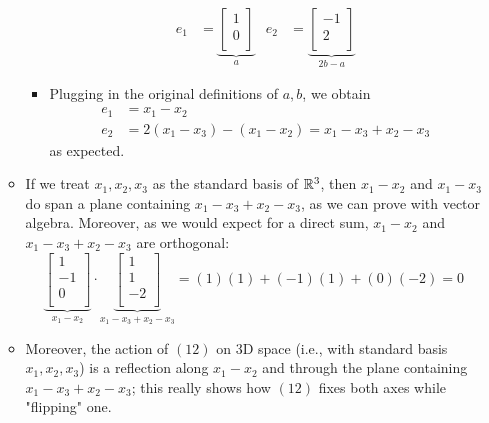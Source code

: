 \documentclass[../notes.tex]{subfiles}
\begin{document}
\begin{itemize}
\begin{itemize}
\begin{itemize}
\begin{align*}
                e_1 &= \underbrace{
                    \begin{bmatrix}
                        1\\
                        0\\
                    \end{bmatrix}
                }_a&
                e_2 &= \underbrace{
                    \begin{bmatrix}
                        -1\\
                        2\\
                    \end{bmatrix}
                }_{2b-a}
            \end{align*}
            \item Plugging in the original definitions of $a,b$, we obtain
            \begin{align*}
                e_1 &= x_1-x_2\\
                e_2 &= 2(x_1-x_3)-(x_1-x_2) = x_1-x_3+x_2-x_3
            \end{align*}
            as expected.
        \end{itemize}
        \item If we treat $x_1,x_2,x_3$ as the standard basis of $\mathbb{R}^3$, then $x_1-x_2$ and $x_1-x_3$ do span a plane containing $x_1-x_3+x_2-x_3$, as we can prove with vector algebra. Moreover, as we would expect for a direct sum, $x_1-x_2$ and $x_1-x_3+x_2-x_3$ are orthogonal:
        \begin{equation*}
            \underbrace{
                \begin{bmatrix}
                    1\\
                    -1\\
                    0\\
                \end{bmatrix}
            }_{x_1-x_2}\cdot\underbrace{
                \begin{bmatrix}
                    1\\
                    1\\
                    -2\\
                \end{bmatrix}
            }_{x_1-x_3+x_2-x_3}
            = (1)(1)+(-1)(1)+(0)(-2)
            = 0
        \end{equation*}
        \item Moreover, the action of $(12)$ on 3D space (i.e., with standard basis $x_1,x_2,x_3$) is a reflection along $x_1-x_2$ and through the plane containing $x_1-x_3+x_2-x_3$; this really shows how $(12)$ fixes both axes while "flipping" one.

\end{itemize}
\end{itemize}
\end{document}
